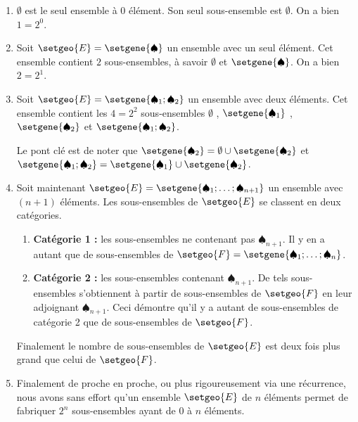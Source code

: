\documentclass[12pt]{amsart}
\begin{document}
\begin{enumerate}
	\medskip
	\item $\emptyset$ est le seul ensemble à $0$ élément. Son seul sous-ensemble est $\emptyset$. On a bien $1 = 2^0$.


	\medskip
	\item Soit $\setgeo{E} = \setgene{\spadesuit}$ un ensemble avec un seul élément. Cet ensemble contient $2$ sous-ensembles, à savoir $\emptyset$ et $\setgene{\spadesuit}$. On a bien $2 = 2^1$.


	\medskip
	\item Soit $\setgeo{E} = \setgene{\spadesuit_1 ; \spadesuit_2}$ un ensemble avec deux éléments.
	      Cet ensemble contient les $4 = 2^2$ sous-ensembles
	      $\emptyset$ , $\setgene{\spadesuit_1}$ ,
	      $\setgene{\spadesuit_2}$ et $\setgene{\spadesuit_1 ; \spadesuit_2}$.
	
	      \noindent
	      Le pont clé est de noter que
	      $\setgene{\spadesuit_2} = \emptyset \cup \setgene{\spadesuit_2}$ et
	      $\setgene{\spadesuit_1 ; \spadesuit_2} = \setgene{\spadesuit_1} \cup \setgene{\spadesuit_2}$.

	\medskip
	\item Soit maintenant $\setgeo{E} = \setgene{\spadesuit_1 ; \dots ; \spadesuit_{n+1}}$ un ensemble avec $(n+1)$ éléments.
		  Les sous-ensembles de $\setgeo{E}$ se classent en deux catégories.
		  
		  \begin{enumerate}
		  		\smallskip
				\item \textbf{Catégorie 1 :} les sous-ensembles ne contenant pas $\spadesuit_{n+1}$.
				      Il y en a autant que de sous-ensembles de $\setgeo{F} = \setgene{\spadesuit_1 ; \dots ; \spadesuit_{n}}$.
		  		
				\smallskip
				\item \textbf{Catégorie 2 :} les sous-ensembles contenant $\spadesuit_{n+1}$.
				      De tels sous-ensembles s'obtiennent à partir de sous-ensembles de $\setgeo{F}$ en leur adjoignant $\spadesuit_{n+1}$.
				      Ceci démontre qu'il y a autant de sous-ensembles de catégorie 2 que de sous-ensembles de $\setgeo{F}$.
		  \end{enumerate}

		  \noindent
		  Finalement le nombre de sous-ensembles de $\setgeo{E}$ est deux fois plus grand que celui de $\setgeo{F}$.


	\medskip
	\item Finalement de proche en proche, ou plus rigoureusement via une récurrence, nous avons sans effort qu'un ensemble $\setgeo{E}$ de $n$ éléments permet de fabriquer $2^n$ sous-ensembles ayant de $0$ à $n$ éléments.
\end{enumerate}
\end{document}
